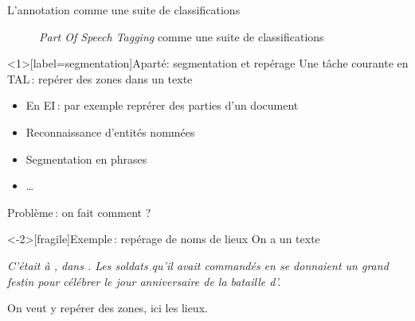 \documentclass[../allslides.tex]{subfiles}
\begin{document}
\begin{frame}[fragile]{L'annotation comme une suite de classifications}
	\begin{figure}
		\tikzset{external/export=true}
		\caption{\emph{Part Of Speech Tagging} comme une suite de classifications}
	\end{figure}
\end{frame}

\begin{frame}<1>[label=segmentation]{Aparté: segmentation et repérage}
	Une tâche courante en TAL : repérer des zones dans un texte
	\begin{itemize}
		\item En EI : par exemple reprérer des parties d'un document
		\item Reconnaissance d'entités nommées
		\item Segmentation en phrases
		\item …
	\end{itemize}

	\pause

	Problème : on fait comment ?
\end{frame}

\begin{frame}<-2>[fragile]{Exemple : repérage de noms de lieux}
	On a un texte

	\vspace{\bigskipamount}
	{\itshape
		C’était à , dans . Les soldats qu’il avait commandés en  se donnaient un grand festin pour célébrer le jour anniversaire de la bataille d’\hightlightikz<2->{Éryx}.
	}
	\vspace{\bigskipamount}

	\pause

	On veut y repérer des zones, ici les \alert{lieux}.
\end{frame}
\end{document}
